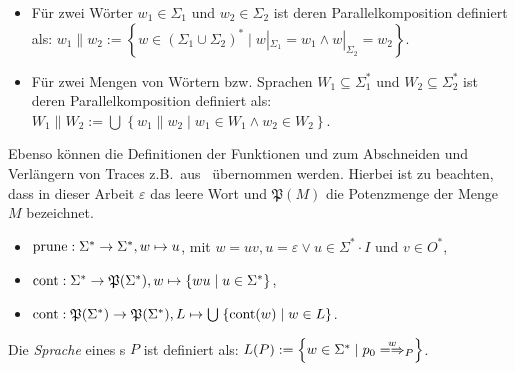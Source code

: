 \begin{Def}\mbox{}
  \begin{itemize}
    \item Für zwei Wörter $w_1\in\Sigma _1$ und $w_2\in\Sigma _2$ ist
      deren Parallelkomposition definiert als: $w_1\| w_2:=\left\{w\in
      (\Sigma _1\cup\Sigma _2)^*\mid w|_{\Sigma _1}=w_1\wedge w|_{\Sigma
    _2}=w_2\right\}$.
    \item Für zwei Mengen von Wörtern bzw. Sprachen $W_1\subseteq \Sigma
      ^*_1$ und $W_2\subseteq \Sigma ^*_2$ ist deren Parallelkomposition
      definiert als: $W_1\| W_2:=\bigcup\hspace{1pt}\left\{w_1\| w_2\mid
      w_1\in W_1\wedge w_2\in W_2\right\}$.
  \end{itemize}
\end{Def}

Ebenso können die Definitionen der Funktionen \prune{} und \cont{} zum
Abschneiden und Verlängern von Traces z.B.\ aus~\cite{Vogler2014EIO} übernommen
werden. Hierbei ist zu beachten, dass in dieser Arbeit $\varepsilon$ das leere
Wort und $\mathfrak{P}(M)$ die Potenzmenge der Menge $M$ bezeichnet.

\begin{Def}\mbox{}
  \begin{itemize}
    \item $\mathrm{prune}{}:\Sigma ^*\rightarrow\Sigma ^*, w\mapsto u$, mit $w=uv,
      u=\varepsilon\vee u\in\Sigma ^*\cdot I$ und $v\in O^*$,
    \item $\mathrm{cont}{}:\Sigma ^*\rightarrow\mathfrak{P}(\Sigma ^*),
      w\mapsto\left\{wu\mid u\in\Sigma ^*\right\}$,
    \item $\mathrm{cont}{}:\mathfrak{P}(\Sigma ^*)\rightarrow\mathfrak{P}(\Sigma ^*),
      L\mapsto\bigcup\hspace{1pt}\left\{\mathrm{cont}{}(w)\mid w\in L\right\}$.
  \end{itemize}
\end{Def}

\vspace{0.2cm}

\begin{Def}[Sprache]
  \label{LDef}
  Die \emph{Sprache} eines \MEIO{}s $P$ ist definiert als: $L(P) := \left\{w\in
  \Sigma ^* \mid p_0\weakmay[w]_P \right\}$.
\end{Def}

